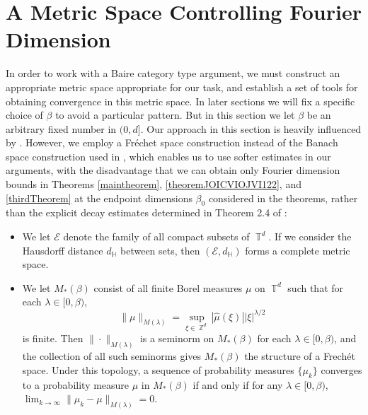 \documentclass[dvipsnames,letterpaper,12pt]{article}
\numberwithin{equation}{section}
\DeclareMathOperator{\ZZ}{\mathbb{Z}}
\DeclareMathOperator{\TT}{\mathbb{T}}
\numberwithin{theorem}{section}
\begin{document}
\section{A Metric Space Controlling Fourier Dimension}

In order to work with a Baire category type argument, we must construct an appropriate metric space appropriate for our task, and establish a set of tools for obtaining convergence in this metric space. In later sections we will fix a specific choice of $\beta$ to avoid a particular pattern. But in this section we let $\beta$ be an arbitrary fixed number in $(0,d]$. Our approach in this section is heavily influenced by \cite{Korner2}. However, we employ a Fr\'{e}chet space construction instead of the Banach space construction used in \cite{Korner2}, which enables us to use softer estimates in our arguments, with the disadvantage that we can obtain only Fourier dimension bounds in Theorems \ref{maintheorem}, \ref{theoremJOICVIOJVI122}, and \ref{thirdTheorem} at the endpoint dimensions $\beta_0$ considered in the theorems, rather than the explicit decay estimates determined in Theorem 2.4 of \cite{Korner2}:
%
\begin{itemize}
    \item We let $\mathcal{E}$ denote the family of all compact subsets of $\TT^d$. If we consider the Hausdorff distance $d_{\mathbb{H}}$ between sets, then $(\mathcal{E},d_\mathbb{H})$ forms a complete metric space. %

    \item We let $M_*(\beta)$ consist of all finite Borel measures $\mu$ on $\TT^d$ such that for each $\lambda \in [0,\beta)$,
    \[ \| \mu \|_{M(\lambda)} = \sup_{\xi \in \ZZ^d} |\widehat{\mu}(\xi)| |\xi|^{\lambda/2} \]
    is finite. Then $\| \cdot \|_{M(\lambda)}$ is a seminorm on $M_*(\beta)$ for each $\lambda \in [0,\beta)$, and the collection of all such seminorms gives $M_*(\beta)$ the structure of a Frech\'{e}t space. Under this topology, a sequence of probability measures $\{ \mu_k \}$ converges to a probability measure $\mu$ in $M_*(\beta)$ if and only if for any $\lambda \in [0,\beta)$, $\lim_{k \to \infty} \| \mu_k - \mu \|_{M(\lambda)} = 0$.
\end{itemize}
\end{document}
